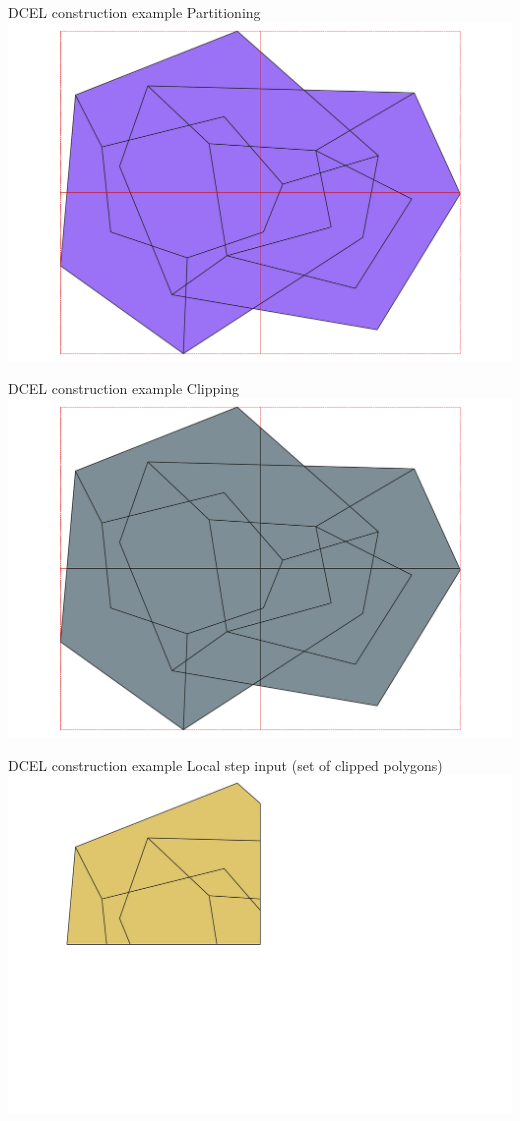 \documentclass{beamer}
\begin{document}
\begin{frame}{DCEL construction example}
    \centering 
    Partitioning \\
    \includegraphics[width=0.8\linewidth]{figures/DCEL02_partitions} 
\end{frame}

\begin{frame}{DCEL construction example}
    \centering 
    Clipping \\
    \includegraphics[width=0.8\linewidth]{figures/DCEL03_clipByPartition} 
\end{frame}

\begin{frame}{DCEL construction example}
    \centering 
    Local step input (set of clipped polygons) \\
    \includegraphics[width=0.8\linewidth]{figures/DCEL04_mapPartition} 
\end{frame}
\end{document}
